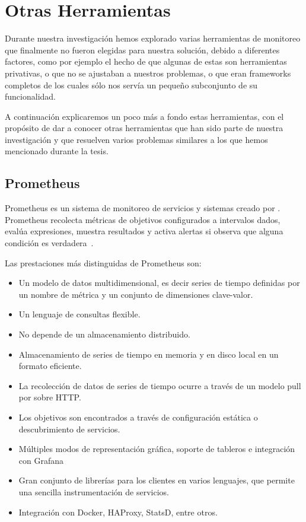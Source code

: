 \section{Otras Herramientas}
\label{anexo:B}

Durante nuestra investigación hemos explorado varias herramientas de monitoreo
que finalmente no fueron elegidas para nuestra solución, debido a diferentes
factores, como por ejemplo el hecho de que algunas de estas son herramientas
privativas, o que no se ajustaban a nuestros problemas, o que eran frameworks
completos de los cuales sólo nos servía un pequeño subconjunto de su
funcionalidad.

A continuación explicaremos un poco más a fondo estas herramientas, con el
propósito de dar a conocer otras herramientas que han sido parte de nuestra
investigación y que resuelven varios problemas similares a los que hemos
mencionado durante la tesis.

\subsection{Prometheus}

Prometheus es un sistema de monitoreo de servicios y sistemas creado por
. Prometheus recolecta métricas de
objetivos configurados a intervalos dados, evalúa expresiones, muestra
resultados y activa alertas si observa que alguna condición es
verdadera~\cite{prometheus}.

Las prestaciones más distinguidas de Prometheus son:

\begin{itemize}
  \item Un modelo de datos multidimensional, es decir series de tiempo
    definidas por un nombre de métrica y un conjunto de dimensiones
    clave-valor.
  \item Un lenguaje de consultas flexible.
  \item No depende de un almacenamiento distribuido.
  \item Almacenamiento de series de tiempo en memoria y en disco local en un
    formato eficiente.
  \item La recolección de datos de series de tiempo ocurre a través de un
    modelo pull por sobre HTTP.
  \item Los objetivos son encontrados a través de configuración estática o
    descubrimiento de servicios.
  \item Múltiples modos de representación gráfica, soporte de tableros e
    integración con Grafana
  \item Gran conjunto de librerías para los clientes en varios lenguajes, que
    permite una sencilla instrumentación de servicios.
  \item Integración con Docker, HAProxy, StatsD, entre otros.
\end{itemize}

